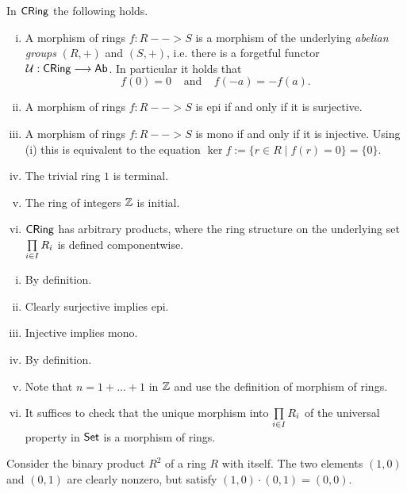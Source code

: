 	\begin{lemma}
		In $\textsf{CRing}$ the following holds.
		\begin{enumerate}[(i)]
			\item{
				A morphism of rings $f:R-->S$ is a morphism of the underlying \textit{abelian groups} $(R,+)$ and $(S,+)$, i.e. there is a forgetful functor $\mathcal{U}:\textsf{CRing} --> \textsf{Ab}$. In particular it holds that
				\begin{equation*}
					f(0) = 0 \;\;\;\;\text{and}\;\;\;\; f(-a) = -f(a).
				\end{equation*}
			}
			\item{
				A morphism of rings $f:R --> S$ is epi if and only if it is surjective.
			}
			\item{
				A morphism of rings $f:R --> S$ is mono if and only if it is injective. Using (i) this is equivalent to the equation $\ker f := \{r \in R \mid f(r) = 0\} = \{0\}$.
			}
			\item{
				The trivial ring $1$ is terminal.
			}
			\item{
				The ring of integers $\mathbb{Z}$ is initial.
			}
			\item{
				$\textsf{CRing}$ has arbitrary products, where the ring structure on the underlying set $\prod \limits_{i \in I} R_i$ is defined componentwise.
			}
		\end{enumerate}
	\end{lemma}
	\begin{sketch}
		\begin{enumerate}[(i)]
			\item{
				By definition.
			}
			\item{
				Clearly surjective implies epi. 
			}
			\item{
				Injective implies mono. 
			}
			\item{
				By definition.
			}
			\item{
				Note that $n = 1 + ... + 1$ in $\mathbb{Z}$ and use the definition of morphism of rings. 
			}
			\item{
				It suffices to check that the unique morphism into $\prod \limits_{i \in I} R_i$ of the universal property in $\textsf{Set}$ is a morphism of rings.
			}
		\end{enumerate}\vspace{-2em}
	\end{sketch}

	Consider the binary product $R^2$ of a ring $R$ with itself. The two elements $(1,0)$ and $(0,1)$ are clearly nonzero, but satisfy $(1,0)\cdot(0,1) = (0,0)$.

